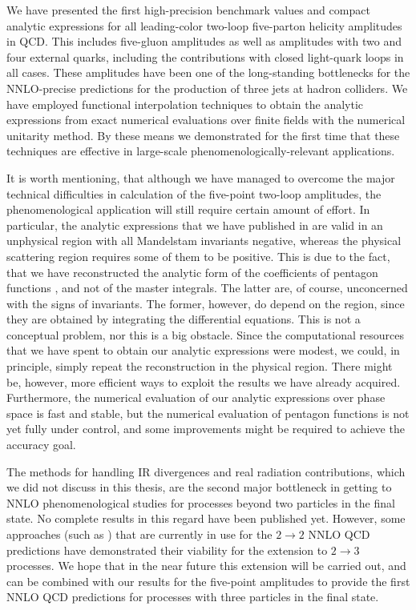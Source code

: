 We have presented the first high-precision benchmark values and compact analytic expressions
for all leading-color two-loop five-parton helicity amplitudes in QCD. This includes
five-gluon amplitudes as well as amplitudes with two and four
external quarks, including the contributions with closed light-quark loops in all cases.
These amplitudes have been one of the long-standing bottlenecks for the NNLO-precise predictions for the production of three jets at hadron colliders.
We have employed functional interpolation techniques to obtain the analytic expressions from exact numerical evaluations over finite fields
with the numerical unitarity method.
By these means we demonstrated for the first time that these techniques are effective in large-scale phenomenologically-relevant applications.

It is worth mentioning,
that although we have managed to overcome the major technical difficulties in calculation of the five-point two-loop amplitudes,
the phenomenological application will still require certain amount of effort. In particular,
the analytic expressions that we have published in \cite{Abreu:2019odu} are valid in an unphysical region with all Mandelstam invariants negative, whereas
the physical scattering region requires some of them to be positive.
This is due to the fact, that we have reconstructed the analytic form of the coefficients of pentagon functions \cite{Gehrmann:2018yef}, and not of the master integrals.
The latter are, of course, unconcerned with the signs of invariants.
The former, however, do depend on the region, since they are obtained by integrating the differential equations.
This is not a conceptual problem, nor this is a big obstacle.
Since the computational resources that we have spent to obtain our analytic expressions were modest, we
could, in principle, simply repeat the reconstruction in the physical region.
There might be, however, more efficient ways to exploit the results we have already acquired.
Furthermore, the numerical evaluation of our analytic expressions over phase space is fast and stable,
but the numerical evaluation of pentagon functions is not yet fully under control, and some improvements might be required to 
achieve the accuracy goal. 

The methods for handling IR divergences and real radiation contributions, which we did not discuss in this thesis,
are the second major bottleneck in getting to NNLO phenomenological studies for processes beyond
two particles in the final state. No complete results in this regard have been published yet.
However, some approaches (such as \cite{GehrmannDeRidder:2005cm,Czakon:2010td,Currie:2013vh}) that are currently in use for the $2\to 2$
NNLO QCD predictions have demonstrated their viability for the extension to $2\to 3$ processes.
We hope that in the near future this extension will be carried out, and can be combined with our results for the five-point amplitudes
to provide the first NNLO QCD predictions for processes with three particles in the final state.

